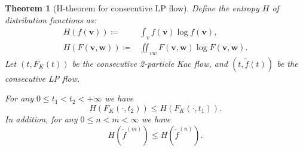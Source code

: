 \documentclass{article}
\newtheorem{theorem}{Theorem}
\numberwithin{equation}{section}
\begin{document}
\begin{theorem}[H-theorem for consecutive LP flow]\label{thm:entropy}
Define the entropy $H$ of distribution functions as:
\begin{equation*}
    \begin{split}
        H(f(\mathbf{v})) \coloneqq & \int_{v} f(\mathbf{v})\log{f(\mathbf{v})},\\
        H(F(\mathbf{v},\mathbf{w})) \coloneqq & \iint_{vw} F(\mathbf{v},\mathbf{w})\log{F(\mathbf{v},\mathbf{w})}.
    \end{split}
\end{equation*}
    Let $(t, F_{K}(t))$ be the consecutive 2-particle Kac flow, and $(t, \widetilde{f}(t))$ be the consecutive LP flow. 
    
    For any $0\leq t_{1}<t_{2}<+\infty$ we have
    \begin{equation*}
            H(F_{K}(\cdot, t_{2})) \leq H(F_{K}(\cdot, t_{1})).
    \end{equation*}
    In addition, for any $0\leq n < m < \infty$ we have
    \begin{equation*}
        H(\widetilde{f}^{(m)}) \leq H(\widetilde{f}^{(n)}). 
    \end{equation*}
\end{theorem}
\end{document}
